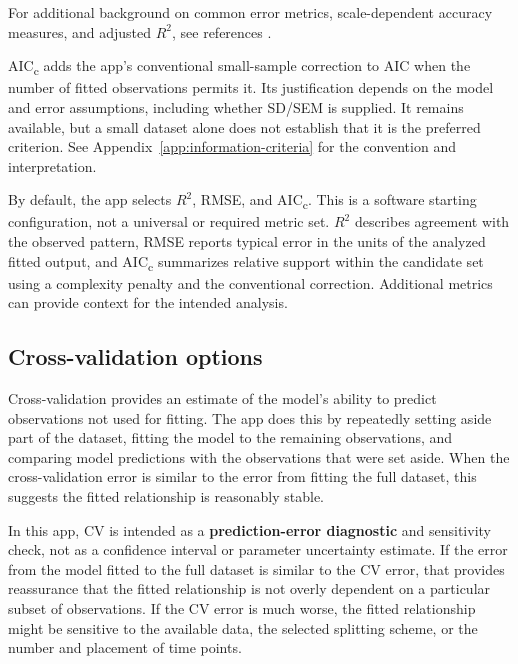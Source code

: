 

For additional background on common error metrics, scale-dependent accuracy measures, and adjusted \(R^2\), see references \cite{hodson2022,hyndman2006,miles2014}.

AIC\textsubscript{c} adds the app's conventional small-sample correction to AIC when the number of fitted observations permits it. Its justification depends on the model and error assumptions, including whether SD/SEM is supplied. It remains available, but a small dataset alone does not establish that it is the preferred criterion. See Appendix~\ref{app:information-criteria} for the convention and interpretation.

By default, the app selects \(R^2\), RMSE, and AIC\textsubscript{c}. This is a software starting configuration, not a universal or required metric set. \(R^2\) describes agreement with the observed pattern, RMSE reports typical error in the units of the analyzed fitted output, and AIC\textsubscript{c} summarizes relative support within the candidate set using a complexity penalty and the conventional correction. Additional metrics can provide context for the intended analysis.

\subsection{Cross-validation options}

Cross-validation provides an estimate of the model's ability to predict observations not used for fitting. The app does this by repeatedly setting aside part of the dataset, fitting the model to the remaining observations, and comparing model predictions with the observations that were set aside. When the cross-validation error is similar to the error from fitting the full dataset, this suggests the fitted relationship is reasonably stable.

In this app, CV is intended as a \textbf{prediction-error diagnostic} and sensitivity check, not as a confidence interval or parameter uncertainty estimate. If the error from the model fitted to the full dataset is similar to the CV error, that provides reassurance that the fitted relationship is not overly dependent on a particular subset of observations. If the CV error is much worse, the fitted relationship might be sensitive to the available data, the selected splitting scheme, or the number and placement of time points.

